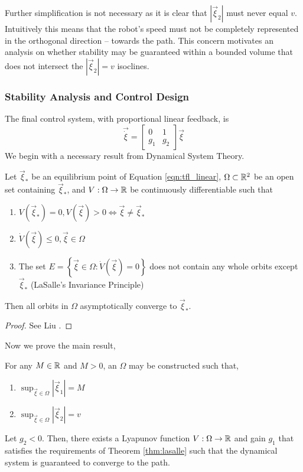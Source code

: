 \documentclass[oneside, 11pt]{book}
\begin{document}
Further simplification is not necessary as it is clear that $\left|\vec{\xi}_2\right|$ must never equal $v$. Intuitively this means that the robot's speed must not be completely represented in the orthogonal direction -- towards the path. This concern motivates an analysis on whether stability may be guaranteed within a bounded volume that does not intersect the $\left|\vec{\xi}_2\right|=v$ isoclines.

\subsubsection{Stability Analysis and Control Design}
The final control system, with proportional linear feedback, is
\begin{equation}
    \vec{\dot{\xi}} =   \begin{bmatrix}
                            0 & 1 \\
                            g_1 & g_2
                        \end{bmatrix}
                        \vec{\xi}
    \label{eqn:tfl_linear}
\end{equation}
We begin with a necessary result from Dynamical System Theory.
\begin{theorem}
    Let $\vec{\xi}_*$ be an equilibrium point of Equation \ref{eqn:tfl_linear}, $\Omega\subset\mathbb{R}^2$ be an open set containing $\vec{\xi}_*$, and $V:\Omega\to\mathbb{R}$ be continuously differentiable such that
    \begin{enumerate}
        \item $V(\vec{\xi}_*) = 0, V(\vec{\xi}) > 0 \Leftrightarrow \vec{\xi}\neq\vec{\xi}_*$
        \item $\dot{V}(\vec{\xi})\leq 0, \vec{\xi}\in\Omega$
        \item The set $E = \left\{ \vec{\xi} \in \Omega : \dot{V}(\vec{\xi}) = 0 \right\}$ does not contain any whole orbits except $\vec{\xi}_*$ (LaSalle's Invariance Principle)
    \end{enumerate}
    Then all orbits in $\Omega$ asymptotically converge to $\vec{\xi}_*$.
    \label{thm:lasalle}
\end{theorem}
\begin{proof}
    See Liu \cite{Liu12}.
\end{proof}
Now we prove the main result,
\begin{theorem}
    For any $M\in\mathbb{R}$ and $M>0$, an $\Omega$ may be constructed such that,
    \begin{enumerate}
        \item $\sup_{\vec{\xi}\in\Omega}{\left|\vec{\xi}_1\right|} = M$
        \item $\sup_{\vec{\xi}\in\Omega}{\left|\vec{\xi}_2\right|} = v$
    \end{enumerate}
    Let $g_2 < 0$. Then, there exists a Lyapunov function $V:\Omega\to\mathbb{R}$ and gain $g_1$ that satisfies the requirements of Theorem \ref{thm:lasalle} such that the dynamical system is guaranteed to converge to the path.
    \label{thm:sf_stability}
\end{theorem}
\end{document}
